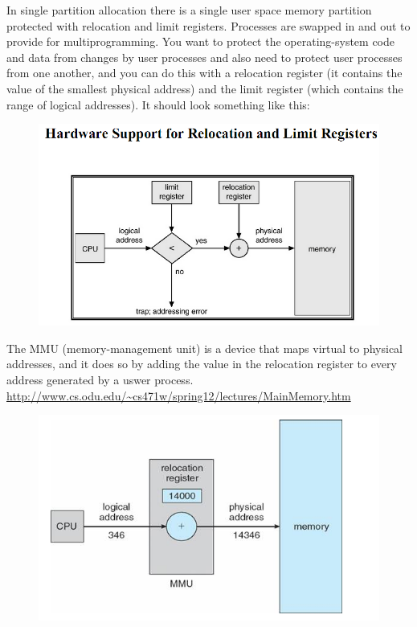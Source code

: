 \documentclass{article}
\begin{document}
In single partition allocation there is a single user space memory partition protected with relocation and limit registers. Processes are swapped in and out to provide for multiprogramming.
You want to protect the operating-system code and data from changes by user processes and also need to protect user processes from one another, and you can do this with a relocation register (it contains the value of the smallest physical address) and the limit register (which contains the range of logical addresses). It should look something like this:
\begin{figure}[h]
\centering
\includegraphics[scale=.7]{fig2.png}
\end{figure}

The MMU (memory-management unit) is a device that maps virtual to physical addresses, and it does so by adding the value in the relocation register to every address generated by a uswer process. \url{http://www.cs.odu.edu/~cs471w/spring12/lectures/MainMemory.htm}




\begin{figure}[h]
\centering
\includegraphics[scale=.7]{fig3.png}
\end{figure}
\end{document}
